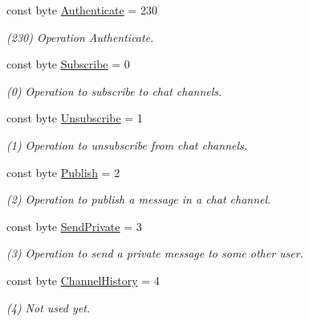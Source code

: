 \begin{DoxyCompactItemize}
\item 
const byte \hyperlink{class_exit_games_1_1_client_1_1_photon_1_1_chat_1_1_chat_operation_code_af1232f522b282a7a5111802982b9ba42}{Authenticate} = 230
\begin{DoxyCompactList}\small\item\em (230) Operation Authenticate.\end{DoxyCompactList}\item 
const byte \hyperlink{class_exit_games_1_1_client_1_1_photon_1_1_chat_1_1_chat_operation_code_a32c3f60a2876738427dca3f2de3bdb30}{Subscribe} = 0
\begin{DoxyCompactList}\small\item\em (0) Operation to subscribe to chat channels.\end{DoxyCompactList}\item 
const byte \hyperlink{class_exit_games_1_1_client_1_1_photon_1_1_chat_1_1_chat_operation_code_a740302e78e835ec1753d4cfa356be98f}{Unsubscribe} = 1
\begin{DoxyCompactList}\small\item\em (1) Operation to unsubscribe from chat channels.\end{DoxyCompactList}\item 
const byte \hyperlink{class_exit_games_1_1_client_1_1_photon_1_1_chat_1_1_chat_operation_code_a0f990d91b96cc9540bd90bb00e1cd59a}{Publish} = 2
\begin{DoxyCompactList}\small\item\em (2) Operation to publish a message in a chat channel.\end{DoxyCompactList}\item 
const byte \hyperlink{class_exit_games_1_1_client_1_1_photon_1_1_chat_1_1_chat_operation_code_abb220662c7522ea1b0943bb845b6c7dc}{Send\+Private} = 3
\begin{DoxyCompactList}\small\item\em (3) Operation to send a private message to some other user.\end{DoxyCompactList}\item 
const byte \hyperlink{class_exit_games_1_1_client_1_1_photon_1_1_chat_1_1_chat_operation_code_a73fb9701994e0bff895effbb28361f68}{Channel\+History} = 4
\begin{DoxyCompactList}\small\item\em (4) Not used yet.\end{DoxyCompactList}\item 

\end{DoxyCompactItemize}
